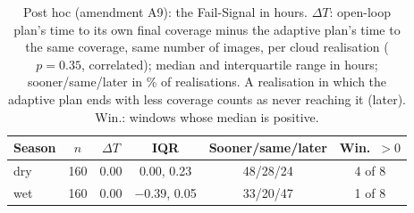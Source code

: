 \begin{table}[H]
\centering
\footnotesize
\renewcommand{\arraystretch}{1.2}
\setlength{\tabcolsep}{3pt}
\caption{Post hoc (amendment A9): the Fail-Signal in hours. $\Delta T$: open-loop plan's time to its own final coverage minus the adaptive plan's time to the same coverage, same number of images, per cloud realisation ($p = 0.35$, correlated); median and interquartile range in hours; sooner/same/later in \% of realisations. A realisation in which the adaptive plan ends with less coverage counts as never reaching it (later). Win.: windows whose median is positive.}
\label{tab:a9_failsignal}
\begin{tabular}{|l|c|c|c|c|c|}
\hline
Season & $n$ & $\Delta T$ & IQR & Sooner/same/later & Win.\ $>0$ \\
\hline
dry & 160 & 0.00 & 0.00, 0.23 & 48/28/24 & 4 of 8 \\
\hline
wet & 160 & 0.00 & $-$0.39, 0.05 & 33/20/47 & 1 of 8 \\
\hline
\end{tabular}
\end{table}
